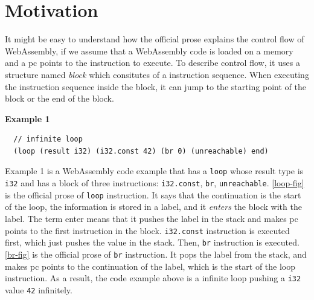 
\chapter{Motivation}
\label{ch:motivation}
\noindent

\newcommand{\officialp}{official prose}
\newcommand{\spectecp}{SpecTec prose}


It might be easy to understand how the \officialp{} explains the control flow
of WebAssembly, if we assume that a WebAssembly code is loaded on a memory and
a pc points to the instruction to execute.
To describe control flow, it uses a structure named \textit{block} which
consitutes of a instruction sequence.
When executing the instruction sequence inside the block, it can jump to the
starting point of the block or the end of the block.

\textbf{Example 1}
\begin{verbatim}
  // infinite loop
  (loop (result i32) (i32.const 42) (br 0) (unreachable) end)
\end{verbatim}

Example 1 is a WebAssembly code example that has a \texttt{loop} whose result
type is \texttt{i32} and has a block of three instructions: \texttt{i32.const},
\texttt{br}, \texttt{unreachable}.
\cref{loop-fig} is the \officialp{} of \texttt{loop} instruction.
It says that the continuation is the start of the loop, the information is
stored in a label, and it \textit{enters} the block with the label.
The term enter means that it pushes the label in the stack and makes pc points
to the first instruction in the block.
\texttt{i32.const} instruction is executed first, which just pushes the
value in the stack.
Then, \texttt{br} instruction is executed.
\cref{br-fig} is the \officialp{} of \texttt{br} instruction.
It pops the label from the stack, and makes pc points to the continuation of
the label, which is the start of the loop instruction.
As a result, the code example above is a infinite loop pushing a \texttt{i32}
value \texttt{42} infinitely.

